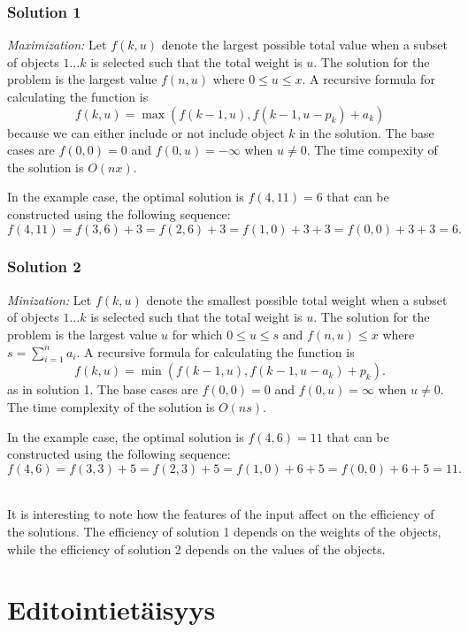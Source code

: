 \subsubsection{Solution 1}

\textit{Maximization:} Let $f(k,u)$
denote the largest possible total value
when a subset of objects $1 \ldots k$ is selected
such that the total weight is $u$.
The solution for the problem is
the largest value
$f(n,u)$ where $0 \le u \le x$.
A recursive formula for calculating
the function is
\[f(k,u) = \max(f(k-1,u),f(k-1,u-p_k)+a_k)\]
because we can either include or not include
object $k$ in the solution.
The base cases are $f(0,0)=0$ and $f(0,u)=-\infty$
when $u \neq 0$. The time compexity of
the solution is $O(nx)$.

In the example case, the optimal solution is
$f(4,11)=6$ that can be constructed
using the following sequence:
\[f(4,11)=f(3,6)+3=f(2,6)+3=f(1,0)+3+3=f(0,0)+3+3=6.\]

\subsubsection{Solution 2}

\textit{Minization:} Let $f(k,u)$
denote the smallest possible total weight
when a subset of objects
$1 \ldots k$ is selected such
that the total weight is $u$.
The solution for the problem is the
largest value $u$
for which  $0 \le u \le s$ and $f(n,u) \le x$
where $s=\sum_{i=1}^n a_i$.
A recursive formula for calculating the function is
\[f(k,u) = \min(f(k-1,u),f(k-1,u-a_k)+p_k).\]
as in solution 1.
The base cases are $f(0,0)=0$ and $f(0,u)=\infty$
when $u \neq 0$.
The time complexity of the solution is $O(ns)$.

In the example case, the optimal solution is $f(4,6)=11$
that can be constructed using the following sequence:
\[f(4,6)=f(3,3)+5=f(2,3)+5=f(1,0)+6+5=f(0,0)+6+5=11.\]

~\\
It is interesting to note how the features of the input
affect on the efficiency of the solutions.
The efficiency of solution 1 depends on the weights
of the objects, while the efficiency of solution 2
depends on the values of the objects.

\section{Editointietäisyys}


